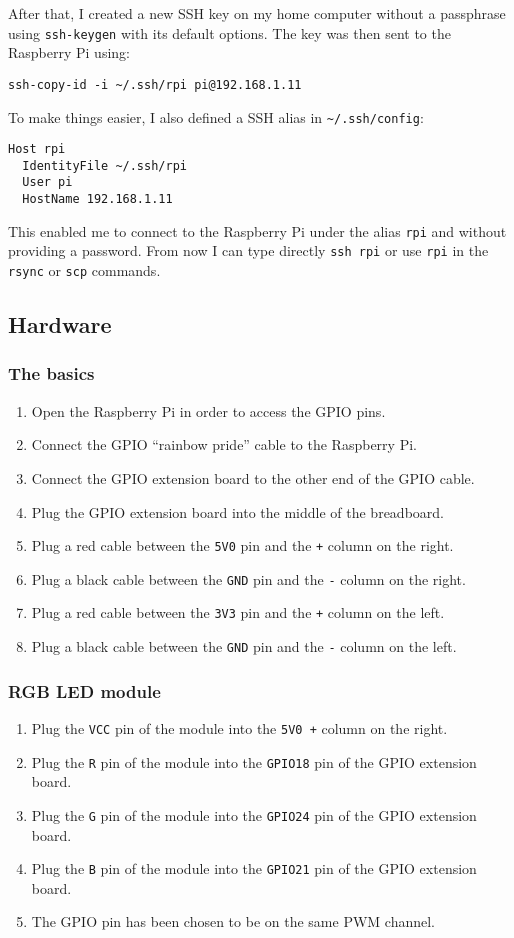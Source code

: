 \documentclass[11pt,a4paper]{article}
\newcommand{\rpi}{Raspberry Pi\xspace}
\newcommand{\plugmodule}[2]{Plug the \texttt{#1} pin of the module into the \texttt{#2} pin of the GPIO extension board.}
\newcommand{\plugcolumn}[4]{Plug a #1 cable between the \texttt{#2} pin and the \texttt{#3} column on the #4.}
\begin{document}
After that, I created a new SSH key on my home computer without a passphrase using \texttt{ssh-keygen} with its default options. The key was then sent to the \rpi using:
\begin{verbatim}
ssh-copy-id -i ~/.ssh/rpi pi@192.168.1.11
\end{verbatim}

To make things easier, I also defined a SSH alias in \verb|~/.ssh/config|:
\begin{verbatim}
Host rpi
  IdentityFile ~/.ssh/rpi
  User pi
  HostName 192.168.1.11
\end{verbatim}

This enabled me to connect to the \rpi under the alias \texttt{rpi} and without providing a password. From now I can type directly \texttt{ssh rpi} or use \texttt{rpi} in the \texttt{rsync} or \texttt{scp} commands.

\subsection{Hardware}

\subsubsection{The basics}

\begin{enumerate}
  \item	Open the \rpi in order to access the GPIO pins.
  \item	Connect the GPIO ``rainbow pride'' cable to the \rpi.
  \item	Connect the GPIO extension board to the other end of the GPIO cable.
  \item	Plug the GPIO extension board into the middle of the breadboard.
  \item	\plugcolumn{red}{5V0}{+}{right}
  \item	\plugcolumn{black}{GND}{-}{right}
  \item	\plugcolumn{red}{3V3}{+}{left}
  \item	\plugcolumn{black}{GND}{-}{left}
\end{enumerate}

\subsubsection{RGB LED module}

\begin{enumerate}
  \item	Plug the \texttt{VCC} pin of the module into the \texttt{5V0 +} column on the right.
  \item	\plugmodule{R}{GPIO18}
  \item	\plugmodule{G}{GPIO24}
  \item	\plugmodule{B}{GPIO21}
  \item	The GPIO pin has been chosen to be on the same PWM channel.
\end{enumerate}
\end{document}
